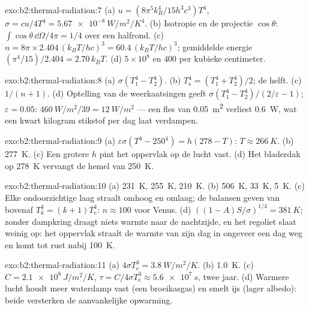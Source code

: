 \begin{solution}{exo:b2:thermal-radiation:7}
(a) $u = (8\pi^5k_B^4/15h^3c^3)T^4$, $\sigma = cu/4T^4 = \qty{5.67e-8}{W/m^2/K^4}$.
(b) Isotropie en de projectie $\cos\theta$: $\int\cos\theta\,\dd\Omega/4\pi = 1/4$
over een halfrond. (c) $n = 8\pi \times 2.404\,(k_BT/hc)^3 = 60.4\,(k_BT/hc)^3$;
gemiddelde energie $(\pi^4/15)/2.404 = 2.70\,k_BT$. (d) $5 \times 10^8$ en $400$
per kubieke centimeter.
\end{solution}

\begin{solution}{exo:b2:thermal-radiation:8}
(a) $\sigma(T_1^4 - T_2^4)$. (b) $T_{\text{s}}^4 = (T_1^4 + T_2^4)/2$; de helft. (c)
$1/(n + 1)$. (d) Optelling van de weerkaatsingen geeft
$\sigma(T_1^4 - T_2^4)/(2/\varepsilon -
1)$; $\varepsilon = 0.05$:
$\qty{460}{W/m^2}/39 = \qty{12}{W/m^2}$ --- een fles van
\qty{0.05}{m^2} verliest \qty{0.6}{W}, wat een kwart kilogram stikstof per dag
laat verdampen.
\end{solution}

\begin{solution}{exo:b2:thermal-radiation:9}
(a) $\varepsilon\sigma(T^4 - 250^4) = h(278 - T)$: $T \approx \qty{266}{K}$. (b)
\qty{277}{K}. (c) Een grotere $h$ pint het oppervlak op de lucht vast. (d)
Het bladerdak
op \qty{278}{K} vervangt de hemel van \qty{250}{K}.
\end{solution}

\begin{solution}{exo:b2:thermal-radiation:10}
(a) \qty{231}{K}, \qty{255}{K}, \qty{210}{K}. (b) \qty{506}{K}, \qty{33}{K},
\qty{5}{K}.
(c) Elke ondoorzichtige laag straalt omhoog en omlaag; de balansen geven
van bovenaf $T_k^4 = (k + 1)T_{\text{e}}^4$: $n \approx 100$ voor Venus. (d)
$((1 - A)S/\sigma)^{1/4} = \qty{381}{K}$; zonder dampkring draagt niets
warmte naar de nachtzijde, en het regoliet slaat weinig op: het oppervlak
straalt de warmte van zijn dag in ongeveer een dag weg en komt tot rust nabij
\qty{100}{K}.
\end{solution}

\begin{solution}{exo:b2:thermal-radiation:11}
(a) $4\sigma T_{\text{e}}^3 = \qty{3.8}{W/m^2/K}$. (b) \qty{1.0}{K}. (c)
$C =
\qty{2.1e8}{J/m^2/K}$,
$\tau = C/4\sigma T_{\text{e}}^3 \approx \qty{5.6e7}{s}$, twee
jaar. (d) Warmere lucht houdt meer waterdamp vast (een broeikasgas) en
smelt ijs (lager albedo): beide versterken de aanvankelijke opwarming.
\end{solution}

